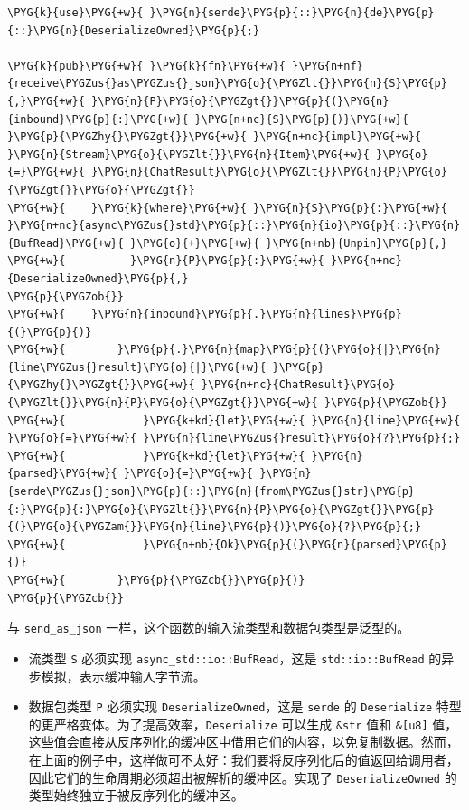 \begin{Verbatim}[commandchars=\\\{\},breaklines=true,breakanywhere=true,fontsize=\codefont,xleftmargin=17bp]
\PYG{k}{use}\PYG{+w}{ }\PYG{n}{serde}\PYG{p}{::}\PYG{n}{de}\PYG{p}{::}\PYG{n}{DeserializeOwned}\PYG{p}{;}

\PYG{k}{pub}\PYG{+w}{ }\PYG{k}{fn}\PYG{+w}{ }\PYG{n+nf}{receive\PYGZus{}as\PYGZus{}json}\PYG{o}{\PYGZlt{}}\PYG{n}{S}\PYG{p}{,}\PYG{+w}{ }\PYG{n}{P}\PYG{o}{\PYGZgt{}}\PYG{p}{(}\PYG{n}{inbound}\PYG{p}{:}\PYG{+w}{ }\PYG{n+nc}{S}\PYG{p}{)}\PYG{+w}{ }\PYG{p}{\PYGZhy{}\PYGZgt{}}\PYG{+w}{ }\PYG{n+nc}{impl}\PYG{+w}{ }\PYG{n}{Stream}\PYG{o}{\PYGZlt{}}\PYG{n}{Item}\PYG{+w}{ }\PYG{o}{=}\PYG{+w}{ }\PYG{n}{ChatResult}\PYG{o}{\PYGZlt{}}\PYG{n}{P}\PYG{o}{\PYGZgt{}}\PYG{o}{\PYGZgt{}}
\PYG{+w}{    }\PYG{k}{where}\PYG{+w}{ }\PYG{n}{S}\PYG{p}{:}\PYG{+w}{ }\PYG{n+nc}{async\PYGZus{}std}\PYG{p}{::}\PYG{n}{io}\PYG{p}{::}\PYG{n}{BufRead}\PYG{+w}{ }\PYG{o}{+}\PYG{+w}{ }\PYG{n+nb}{Unpin}\PYG{p}{,}
\PYG{+w}{          }\PYG{n}{P}\PYG{p}{:}\PYG{+w}{ }\PYG{n+nc}{DeserializeOwned}\PYG{p}{,}
\PYG{p}{\PYGZob{}}
\PYG{+w}{    }\PYG{n}{inbound}\PYG{p}{.}\PYG{n}{lines}\PYG{p}{(}\PYG{p}{)}
\PYG{+w}{        }\PYG{p}{.}\PYG{n}{map}\PYG{p}{(}\PYG{o}{|}\PYG{n}{line\PYGZus{}result}\PYG{o}{|}\PYG{+w}{ }\PYG{p}{\PYGZhy{}\PYGZgt{}}\PYG{+w}{ }\PYG{n+nc}{ChatResult}\PYG{o}{\PYGZlt{}}\PYG{n}{P}\PYG{o}{\PYGZgt{}}\PYG{+w}{ }\PYG{p}{\PYGZob{}}
\PYG{+w}{            }\PYG{k+kd}{let}\PYG{+w}{ }\PYG{n}{line}\PYG{+w}{ }\PYG{o}{=}\PYG{+w}{ }\PYG{n}{line\PYGZus{}result}\PYG{o}{?}\PYG{p}{;}
\PYG{+w}{            }\PYG{k+kd}{let}\PYG{+w}{ }\PYG{n}{parsed}\PYG{+w}{ }\PYG{o}{=}\PYG{+w}{ }\PYG{n}{serde\PYGZus{}json}\PYG{p}{::}\PYG{n}{from\PYGZus{}str}\PYG{p}{:}\PYG{p}{:}\PYG{o}{\PYGZlt{}}\PYG{n}{P}\PYG{o}{\PYGZgt{}}\PYG{p}{(}\PYG{o}{\PYGZam{}}\PYG{n}{line}\PYG{p}{)}\PYG{o}{?}\PYG{p}{;}
\PYG{+w}{            }\PYG{n+nb}{Ok}\PYG{p}{(}\PYG{n}{parsed}\PYG{p}{)}
\PYG{+w}{        }\PYG{p}{\PYGZcb{}}\PYG{p}{)}
\PYG{p}{\PYGZcb{}}
\end{Verbatim}

与 \texttt{send\_as\_json} 一样，这个函数的输入流类型和数据包类型是泛型的。

\begin{itemize}
\item 流类型 \texttt{S} 必须实现 \texttt{async\_std::io::BufRead}，这是 \texttt{std::io::BufRead} 的异步模拟，表示缓冲输入字节流。
\item 数据包类型 \texttt{P} 必须实现 \texttt{DeserializeOwned}，这是 \texttt{serde} 的 \texttt{Deserialize} 特型的更严格变体。为了提高效率，\texttt{Deserialize} 可以生成 \texttt{\&str} 值和 \texttt{\&[u8]} 值，这些值会直接从反序列化的缓冲区中借用它们的内容，以免复制数据。然而，在上面的例子中，这样做可不太好：我们要将反序列化后的值返回给调用者，因此它们的生命周期必须超出被解析的缓冲区。实现了 \texttt{DeserializeOwned} 的类型始终独立于被反序列化的缓冲区。
\end{itemize}


